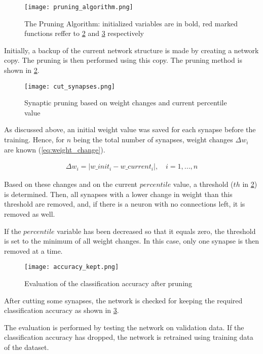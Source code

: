 \begin{figure}[H]
  \centering
  \texttt{[image: pruning\_algorithm.png]}
  \caption{The Pruning Algorithm: initialized variables are in bold, red marked functions reffer to \ref{img:cut_synapses} and \ref{img:accuracy_kept} respectively}
  \label{img:pruning_algorithm}
\end{figure}

Initially, a backup of the current network structure is made by creating a network copy. The pruning is then performed using this copy. The pruning method is shown in \cref{img:cut_synapses}.

\begin{figure}[H]
  \centering
  \texttt{[image: cut\_synapses.png]}
  \caption{Synaptic pruning based on weight changes and current percentile value}
  \label{img:cut_synapses}
\end{figure}

As discussed above, an initial weight value was saved for each synapse before the training. Hence, for $ n $ being the total number of synapses, weight changes $ \Delta w_i $ are known (\ref{eq:weight_change}).

\begin{align} \label{eq:weight_change}
\Delta w_i = |w\_init_i - w\_current_i|, \quad i = 1, ..., n
\end{align}

Based on these changes and on the current $ percentile $ value, a threshold ($ th $ in \cref{img:cut_synapses}) is determined. Then, all synapses with a lower change in weight than this threshold are removed, and, if there is a neuron with no connections left, it is removed as well.

If the $ percentile $ variable has been decreased so that it equals zero, the threshold is set to the minimum of all weight changes. In this case, only one synapse is then removed at a time.

\begin{figure}[H]
  \centering
  \texttt{[image: accuracy\_kept.png]}
  \caption{Evaluation of the classification accuracy after pruning}
  \label{img:accuracy_kept}
\end{figure}

After cutting some synapses, the network is checked for keeping the required classification accuracy as shown in \cref{img:accuracy_kept}.

The evaluation is performed by testing the network on validation data. If the classification accuracy has dropped, the network is retrained using training data of the dataset.

